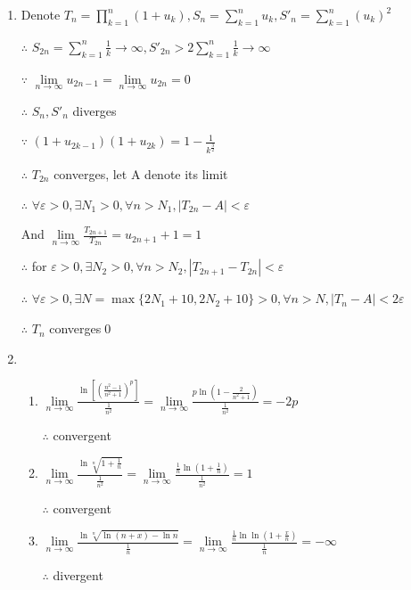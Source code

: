 \begin{enumerate}[1]
        \item
        Denote $T_n=\prod\limits_{k=1}^{n} (1+u_k),S_n=\sum\limits_{k=1}^{n} u_k, S'_n=\sum\limits_{k=1}^{n} (u_k)^2$
        \par $\therefore$ $S_{2n}=\sum\limits_{k=1}^n\frac{1}{k}\rightarrow \infty,S'_{2n}>2\sum\limits_{k=1}^n\frac{1}{k}\rightarrow \infty$
        \par $\because$ $\lim\limits_{n\rightarrow{\infty}}u_{2n-1}=\lim\limits_{n\rightarrow{\infty}}u_{2n}=0$
        \par $\therefore$ $S_n,S'_n$ diverges
        \par $\because$ $(1+u_{2k-1})(1+u_{2k})=1-\frac{1}{k^{\frac{3}{2}}}$
        \par $\therefore$ $T_{2n}$ converges, let A denote its limit
        \par $\therefore$ $\forall \varepsilon >0,\exists N_1>0,\forall n>N_1, |T_{2n}-A|<\varepsilon$
        \par And $\lim\limits_{n\rightarrow{\infty}}\frac{T_{2n+1}}{T_{2n}}=u_{2n+1}+1=1$
        \par $\therefore$ for $\varepsilon >0,\exists N_2>0,\forall n>N_2,|T_{2n+1}-T_{2n}|<\varepsilon$
        \par $\therefore$ $\forall \varepsilon >0,\exists N=\max \{2N_1+10,2N_2+10\}>0,\forall n>N, |T_{n}-A|<2\varepsilon$
        \par $\therefore$ $T_{n}$ converges\qed

        \item
            \begin{enumerate}[(1)]
                \item
                $\lim\limits_{n\rightarrow{\infty}}\frac{\ln [(\frac{n^2-1}{n^2+1})^p]}{\frac{1}{n^2}}=\lim\limits_{n\rightarrow{\infty}}\frac{p\ln (1-\frac{2}{n^2+1})}{\frac{1}{n^2}}=-2p$
                \par $\therefore$ convergent

                \item
                $\lim\limits_{n\rightarrow{\infty}}\frac{\ln \sqrt[n]{1+\frac{1}{n}}}{\frac{1}{n^2}}=\lim\limits_{n\rightarrow{\infty}}\frac{\frac{1}{n}\ln (1+\frac{1}{n})}{\frac{1}{n^2}}=1$
                \par $\therefore$ convergent

                \item
                $\lim\limits_{n\rightarrow{\infty}}\frac{\ln \sqrt[n]{\ln (n+x)-\ln n}}{\frac{1}{n}}=\lim\limits_{n\rightarrow{\infty}}\frac{\frac{1}{n}\ln \ln (1+\frac{x}{n})}{\frac{1}{n}}=-\infty$
                \par $\therefore$ divergent


\end{enumerate}
\end{enumerate}
